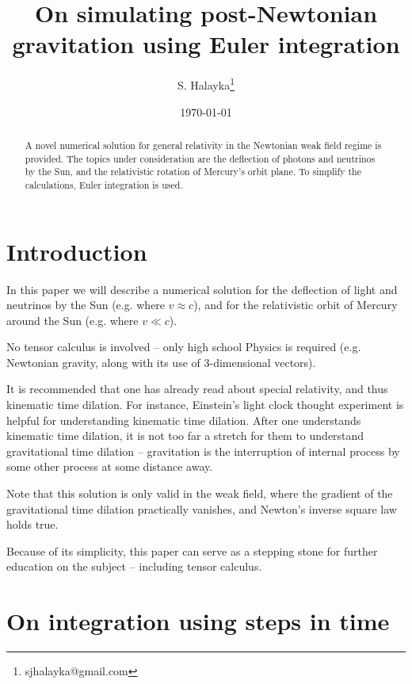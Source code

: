 \documentclass[12pt]{article}
\title{On simulating post-Newtonian gravitation using Euler integration}
\author{S. Halayka\footnote{sjhalayka@gmail.com}}
\date{\today\;\currenttime}
\begin{document}
 
\maketitle

\begin{abstract}
A novel numerical solution for general relativity in the Newtonian weak field regime is provided.
The topics under consideration are the deflection of photons and neutrinos by the Sun, and the relativistic rotation of Mercury's orbit plane.
To simplify the calculations, Euler integration is used.
\end{abstract}


\section{Introduction}

In this paper we will describe a numerical solution for the deflection of light and neutrinos by the Sun (e.g. where $v \approx c$), and for the relativistic orbit of Mercury around the Sun (e.g. where $v \ll c$). 

No tensor calculus is involved -- only high school Physics is required (e.g. Newtonian gravity, along with its use of 3-dimensional vectors).

It is recommended that one has already read about special relativity, and thus kinematic time dilation.
For instance, Einstein's light clock thought experiment is helpful for understanding kinematic time dilation.
After one understands kinematic time dilation, it is not too far a stretch for them to understand gravitational time dilation -- gravitation is the interruption of internal process by some other process at some distance away.

Note that this solution is only valid in the weak field, where the gradient of the gravitational time dilation practically vanishes, and Newton's inverse square law holds true.

Because of its simplicity, this paper can serve as a stepping stone for further education on the subject -- including tensor calculus.





\section{On integration using steps in time}
\end{document}
